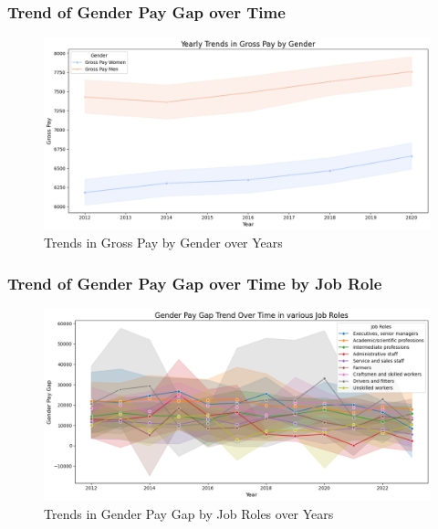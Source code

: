 \documentclass{beamer}
\begin{document}
\begin{frame}
\frametitle{Trend of Gender Pay Gap over Time}
\begin{center}
\begin{figure}[H]
    \includegraphics[width=\textwidth]{Figures/Trends_Gross_Pay_Gender.png}
    \caption{Trends in Gross Pay by Gender over Years}
    \label{fig:gross_trend}
\end{figure}
\end{center}
\end{frame}

\begin{frame}
\frametitle{Trend of Gender Pay Gap over Time by Job Role}
\begin{center}
\begin{figure}[H]
    \includegraphics[width=\textwidth]{Figures/Gap_over_Time_Roles.png}
    \caption{Trends in Gender Pay Gap by Job Roles over Years}
    \label{fig:roles_trend}
\end{figure}
\end{center}
\end{frame}
\end{document}
